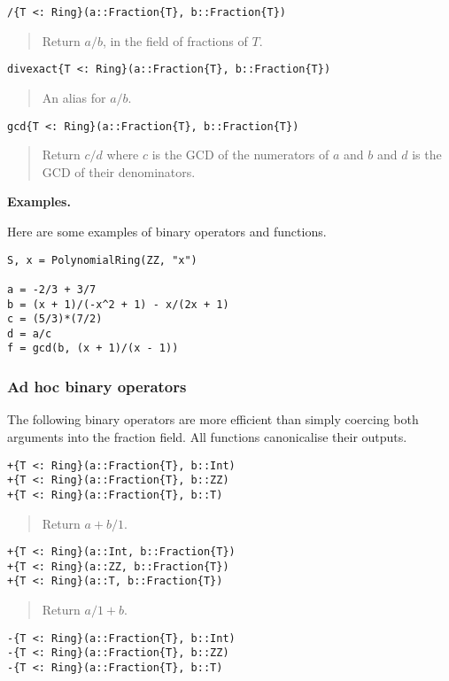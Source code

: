 \documentclass[a4paper,10pt]{article}
\newcommand{\desc}[1]{\vspace{-3mm}\begin{quote}#1\end{quote}}
\begin{document}
{{{\begin{lstlisting}
/{T <: Ring}(a::Fraction{T}, b::Fraction{T})
\end{lstlisting}

\desc{Return $a/b$, in the field of fractions of $T$.}

\begin{lstlisting}
divexact{T <: Ring}(a::Fraction{T}, b::Fraction{T})
\end{lstlisting}

\desc{An alias for $a/b$.}

\begin{lstlisting}
gcd{T <: Ring}(a::Fraction{T}, b::Fraction{T})
\end{lstlisting}

\desc{Return $c/d$ where $c$ is the GCD of the numerators of $a$ and $b$ and
$d$ is the GCD of their denominators.}

\textbf{Examples.}

Here are some examples of binary operators and functions.

\begin{lstlisting}
S, x = PolynomialRing(ZZ, "x")

a = -2/3 + 3/7
b = (x + 1)/(-x^2 + 1) - x/(2x + 1)
c = (5/3)*(7/2)
d = a/c
f = gcd(b, (x + 1)/(x - 1))
\end{lstlisting}

\subsubsection{Ad hoc binary operators}

The following binary operators are more efficient than simply coercing both
arguments into the fraction field. All functions canonicalise their outputs.

\begin{lstlisting}
+{T <: Ring}(a::Fraction{T}, b::Int)
+{T <: Ring}(a::Fraction{T}, b::ZZ)
+{T <: Ring}(a::Fraction{T}, b::T)
\end{lstlisting}

\desc{Return $a + b/1$.}

\begin{lstlisting}
+{T <: Ring}(a::Int, b::Fraction{T})
+{T <: Ring}(a::ZZ, b::Fraction{T})
+{T <: Ring}(a::T, b::Fraction{T})
\end{lstlisting}

\desc{Return $a/1 + b$.}

\begin{lstlisting}
-{T <: Ring}(a::Fraction{T}, b::Int)
-{T <: Ring}(a::Fraction{T}, b::ZZ)
-{T <: Ring}(a::Fraction{T}, b::T)
\end{lstlisting}

}}}
\end{document}
